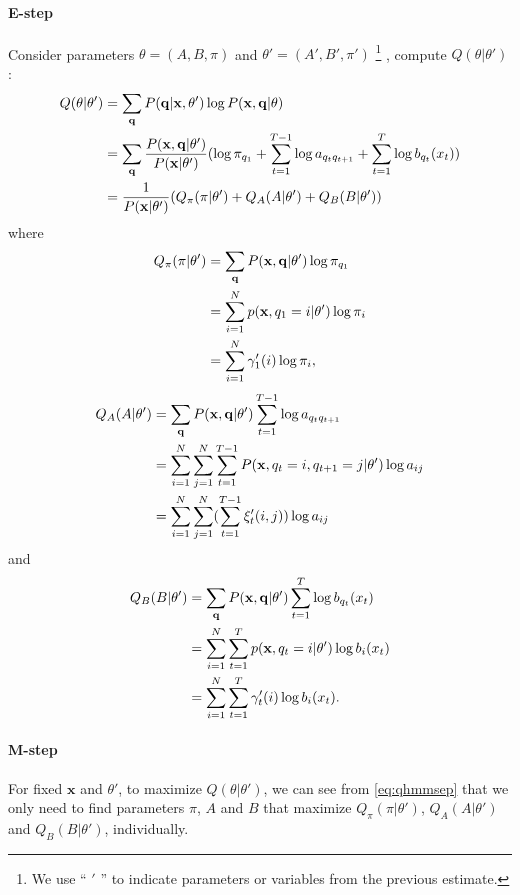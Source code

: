 \documentclass[12pt,final,twoside]{report}
\theoremstyle{plain}
\theoremstyle{definition}
\theoremstyle{remark}
\begin{document}
\paragraph{E-step}
Consider parameters $\theta=(A,B,\pi)$ and $\theta'=(A',B',\pi')$ 
\footnote{We use `` $'$ '' to indicate parameters or variables from the previous estimate.}
, compute $Q(\theta|\theta')$:
\begin{align}
  Q(\theta|\theta') &= \sum_{\mathbf{q}} P(\mathbf{q}|\mathbf{x},\theta') \log P(\mathbf{x},\mathbf{q}|\theta) \notag\\
  &= \sum_{\mathbf{q}} \frac{P(\mathbf{x},\mathbf{q}|\theta')}{P(\mathbf{x}|\theta')} 
  (\log \pi_{q_1} + \sum_{t=1}^{T-1} \log a_{q_t q_{t+1}} + \sum_{t=1}^{T} \log b_{q_t}(x_t) ) \notag\\
  &= \frac{1}{P(\mathbf{x}|\theta')} (Q_\pi(\pi|\theta') + Q_A(A|\theta') + Q_B(B|\theta'))
  \label{eq:qhmmsep}
\end{align}
where
\begin{align}
  Q_\pi(\pi|\theta') &= \sum_{\mathbf{q}} P(\mathbf{x},\mathbf{q}|\theta') \log \pi_{q_1}  \notag\\
  &= \sum_{i=1}^{N} p(\mathbf{x},q_1=i|\theta') \log \pi_{i} \notag\\
  &= \sum_{i=1}^{N} \gamma'_1(i) \log \pi_{i},
\end{align}
\begin{align}
  Q_A(A|\theta') &= \sum_{\mathbf{q}} P(\mathbf{x},\mathbf{q}|\theta') \sum_{t=1}^{T-1} \log a_{q_t q_{t+1}} \notag\\
  &= \sum_{i=1}^{N} \sum_{j=1}^{N} \sum_{t=1}^{T-1} P(\mathbf{x},q_t=i,q_{t+1}=j|\theta') \log a_{ij} \notag\\
  &= \sum_{i=1}^{N} \sum_{j=1}^{N} (\sum_{t=1}^{T-1} \xi'_t(i, j)) \log a_{ij}
\end{align}
and
\begin{align}
  Q_B(B|\theta') &= \sum_{\mathbf{q}} P(\mathbf{x},\mathbf{q}|\theta') \sum_{t=1}^{T} \log b_{q_t}(x_t) \notag\\
  &= \sum_{i=1}^{N} \sum_{t=1}^{T} p(\mathbf{x},q_t=i|\theta') \log b_{i}(x_t) \notag\\
  &= \sum_{i=1}^{N} \sum_{t=1}^{T} \gamma'_t(i) \log b_{i}(x_t) .
  \label{eq:qhmmb}
\end{align}

\paragraph{M-step}
For fixed $\mathbf{x}$ and $\theta'$, to maximize $Q(\theta|\theta')$, we can see from \cref{eq:qhmmsep} that we only need to find parameters $\pi$, $A$ and $B$ that maximize $Q_\pi(\pi|\theta')$, $Q_A(A|\theta')$ and $Q_B(B|\theta')$, individually.
\end{document}
